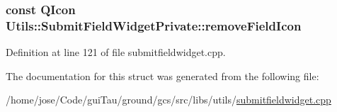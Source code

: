 \hypertarget{struct_utils_1_1_submit_field_widget_private_ad187fd205eb615850c5c785caa617d89}{
\subsubsection[{remove\-Field\-Icon}]{\setlength{\rightskip}{0pt plus 5cm}const Q\-Icon Utils\-::\-Submit\-Field\-Widget\-Private\-::remove\-Field\-Icon}}\label{struct_utils_1_1_submit_field_widget_private_ad187fd205eb615850c5c785caa617d89}


Definition at line 121 of file submitfieldwidget.\-cpp.



The documentation for this struct was generated from the following file\-:\begin{DoxyCompactItemize}
\item 
/home/jose/\-Code/gui\-Tau/ground/gcs/src/libs/utils/\hyperlink{submitfieldwidget_8cpp}{submitfieldwidget.\-cpp}\end{DoxyCompactItemize}
